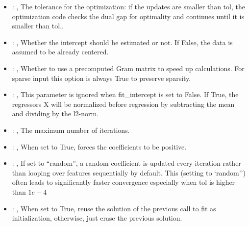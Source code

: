 \begin{itemize}
    \item {}: , 
      The tolerance for the optimization: if the updates are smaller
      than tol, the optimization code checks the dual gap for optimality and
      continues until it is smaller than tol..

    \item {}: , 
      Whether the intercept should be estimated or not. If False,
      the data is assumed to be already centered.

    \item {}: , 
      Whether to use a precomputed Gram matrix to speed up calculations.
      For sparse input this option is always True to preserve sparsity.

    \item {}: , 
      This parameter is ignored when fit\_intercept is set to False. If True,
      the regressors X will be normalized before regression by subtracting the mean and
      dividing by the l2-norm.

    \item {}: , 
      The maximum number of iterations.

    \item {}: , 
      When set to True, forces the coefficients to be positive.

    \item {}: , 
      If set to ``random'', a random coefficient is updated every iteration
      rather than looping over features sequentially by default. This (setting to `random'')
      often leads to significantly faster convergence especially when tol is higher than $1e-4$

    \item {}: , 
      When set to True, reuse the solution of the previous call
      to fit as initialization, otherwise, just erase the previous solution.
  \end{itemize}


